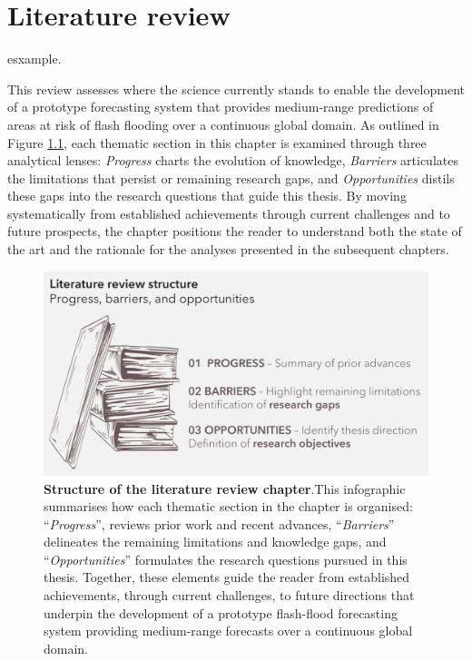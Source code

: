 \chapter{Literature review}
\label{literature_review}


\citep{Abegaz_2024} esxample.

This review assesses where the science currently stands to enable the development of a prototype forecasting system that provides medium-range predictions of areas at risk of flash flooding over a continuous global domain. As outlined in Figure \ref{fig:literature_structure}, each thematic section in this chapter is examined through three analytical lenses: \textit{Progress} charts the evolution of knowledge, \textit{Barriers} articulates the limitations that persist or remaining research gaps, and \textit{Opportunities} distils these gaps into the research questions that guide this thesis. By moving systematically from established achievements through current challenges and to future prospects, the chapter positions the reader to understand both the state of the art and the rationale for the analyses presented in the subsequent chapters.

\begin{figure}[htbp]
\centering
\includegraphics[scale=1.04]{Figures/Chapter_02/literature_structure.png}
\caption{\textbf{Structure of the literature review chapter}.This infographic summarises how each thematic section in the chapter is organised: “\textit{Progress}”, reviews prior work and recent advances, “\textit{Barriers}” delineates the remaining limitations and knowledge gaps, and “\textit{Opportunities}” formulates the research questions pursued in this thesis. Together, these elements guide the reader from established achievements, through current challenges, to future directions that underpin the development of a prototype flash-flood forecasting system providing medium-range forecasts over a continuous global domain.}
\label{fig:literature_structure}
\end{figure}


